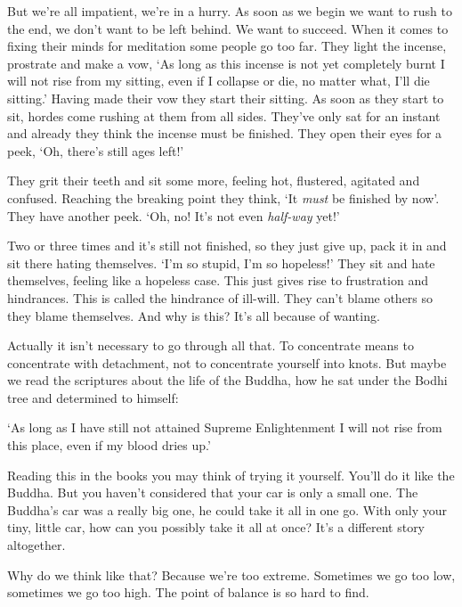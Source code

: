 But we're all impatient, we're in a hurry. As soon as we begin we want to rush to the end, we don't want to be left behind. We want to succeed. When it comes to fixing their minds for meditation some people go too far. They light the incense, prostrate and make a vow, `As long as this incense is not yet completely burnt I will not rise from my sitting, even if I collapse or die, no matter what, I'll die sitting.' Having made their vow they start their sitting. As soon as they start to sit,  hordes come rushing at them from all sides. They've only sat for an instant and already they think the incense must be finished. They open their eyes for a peek, `Oh, there's still ages left!'

They grit their teeth and sit some more, feeling hot, flustered, agitated and confused. Reaching the breaking point they think, `It \textit{must} be finished by now'. They have another peek. `Oh, no! It's not even \textit{half-way} yet!'

Two or three times and it's still not finished, so they just give up, pack it in and sit there hating themselves. `I'm so stupid, I'm so hopeless!' They sit and hate themselves, feeling like a hopeless case. This just gives rise to frustration and hindrances. This is called the hindrance of ill-will. They can't blame others so they blame themselves. And why is this? It's all because of wanting.

Actually it isn't necessary to go through all that. To concentrate means to concentrate with detachment, not to concentrate yourself into knots. But maybe we read the scriptures about the life of the Buddha, how he sat under the Bodhi tree and determined to himself:

`As long as I have still not attained Supreme Enlightenment I will not rise from this place, even if my blood dries up.'

Reading this in the books you may think of trying it yourself. You'll do it like the Buddha. But you haven't considered that your car is only a small one. The Buddha's car was a really big one, he could take it all in one go. With only your tiny, little car, how can you possibly take it all at once? It's a different story altogether.

Why do we think like that? Because we're too extreme. Sometimes we go too low, sometimes we go too high. The point of balance is so hard to find.

